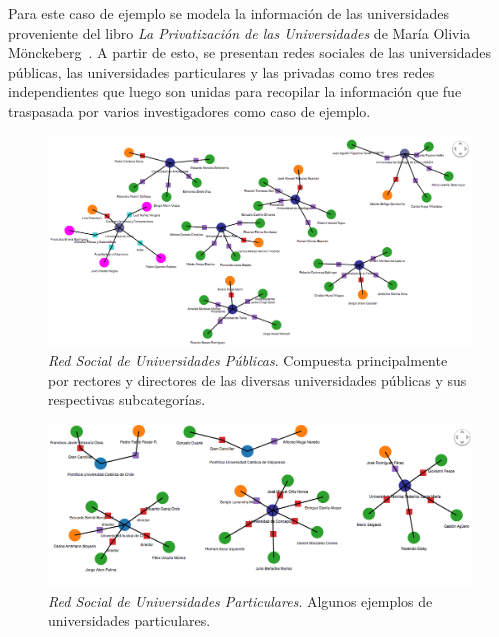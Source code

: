 Para este caso de ejemplo se modela la información de las universidades proveniente del libro \emph{La Privatización de las Universidades} de María Olivia Mönckeberg~\cite{privatizacion_universidades}. A partir de esto, se presentan redes sociales de las universidades públicas, las universidades particulares y las privadas como tres redes independientes que luego son unidas para recopilar la información que fue traspasada por varios investigadores como caso de ejemplo.\\

\begin{figure}[H]
  \centering
  \includegraphics[width=1.0\textwidth]{images/universidades_publicas.png}
  \caption[Red Social de Universidades Públicas]{\emph{Red Social de Universidades Públicas}. Compuesta principalmente por rectores y directores de las diversas universidades públicas y sus respectivas subcategorías.}
  \label{universidades_publicas}
\end{figure}

\begin{figure}[H]
  \centering
  \includegraphics[width=1.0\textwidth]{images/universidades_particulares.png}
  \caption[Red Social de Universidades Particulares]{\emph{Red Social de Universidades Particulares}. Algunos ejemplos de universidades particulares.}
  \label{universidades_particulares}
\end{figure}

